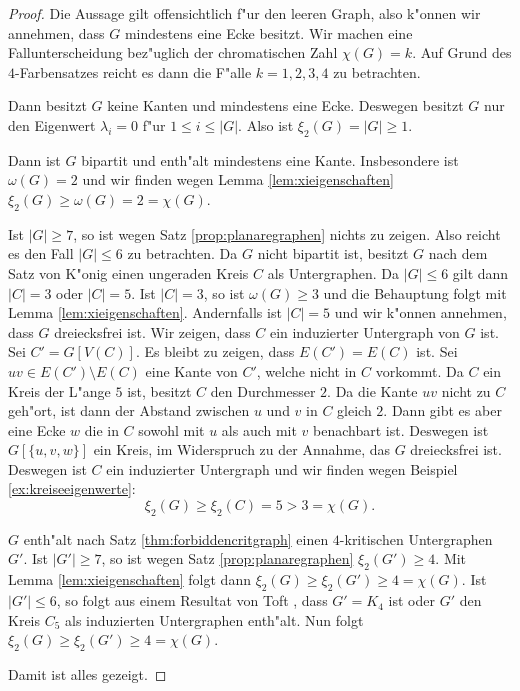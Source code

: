  \begin{proof}
    Die Aussage gilt offensichtlich f"ur den leeren Graph, also k"onnen wir annehmen, dass $G$ mindestens eine Ecke besitzt.
    Wir machen eine Fallunterscheidung bez"uglich der chromatischen Zahl $\chi(G)=k$. Auf Grund des $4$-Farbensatzes reicht es dann die F"alle $k=1,2,3,4$ zu betrachten.

     Dann besitzt $G$ keine Kanten und mindestens eine Ecke. Deswegen besitzt $G$ nur den Eigenwert $\lambda_i = 0$ f"ur $1 \leq i \leq |G|$. Also ist $\xi_{2}(G) = |G| \geq 1$.

     Dann ist $G$ bipartit und enth"alt mindestens eine Kante. Insbesondere ist $\omega(G) = 2$ und wir finden wegen Lemma \ref{lem:xieigenschaften} $\xi_{2}(G) \geq \omega(G) = 2 = \chi(G)$.

     Ist $|G| \geq 7$, so ist wegen Satz \ref{prop:planaregraphen} nichts zu zeigen. Also reicht es den Fall $|G| \leq 6$ zu betrachten. Da $G$ nicht bipartit ist, besitzt $G$ nach dem Satz von K"onig einen ungeraden Kreis $C$ als Untergraphen. Da $|G| \leq 6$ gilt dann $|C| = 3$ oder  $|C| = 5$.
    Ist $|C| = 3$, so ist $\omega(G) \geq 3$ und die Behauptung folgt mit Lemma \ref{lem:xieigenschaften}. 
    Andernfalls ist $|C| = 5$ und wir k"onnen annehmen, dass $G$ dreiecksfrei ist. Wir zeigen, dass $C$ ein induzierter Untergraph von $G$ ist. Sei $C' = G[V(C)]$. Es bleibt zu zeigen, dass $E(C') = E(C)$ ist. Sei $uv\in E(C')\setminus E(C)$ eine Kante von $C'$, welche nicht in $C$ vorkommt. 
    Da $C$ ein Kreis der L"ange $5$ ist, besitzt $C$ den Durchmesser $2$. Da die Kante $uv$ nicht zu $C$ geh"ort, ist dann der Abstand zwischen $u$ und $v$ in $C$ gleich $2$. 
    Dann gibt es aber eine Ecke $w$ die in $C$ sowohl mit $u$ als auch mit $v$ benachbart ist.
    Deswegen ist $G[\{u,v,w\}]$ ein Kreis, im Widerspruch zu der Annahme, das $G$ dreiecksfrei ist.
    Deswegen ist $C$ ein induzierter Untergraph und wir finden wegen Beispiel \ref{ex:kreiseeigenwerte}:
    $$\xi_{2}(G) \geq \xi_{2}(C) = 5 > 3 = \chi(G).$$

     $G$ enth"alt nach Satz \ref{thm:forbiddencritgraph} einen $4$-kritischen Untergraphen $G'$. Ist $|G'| \geq 7$, so ist wegen Satz \ref{prop:planaregraphen} $\xi_{2}(G') \geq 4$. Mit Lemma \ref{lem:xieigenschaften} folgt dann $\xi_{2}(G) \geq \xi_{2}(G') \geq 4 = \chi(G)$.
    Ist $|G'| \leq 6$, so folgt aus einem Resultat von Toft \cite{Toft74b}, dass $G' = K_4$ ist oder $G'$ den Kreis $C_5$ als induzierten Untergraphen enth"alt. Nun folgt $\xi_{2}(G) \geq \xi_{2}(G') \geq 4 = \chi(G)$. 

    Damit ist alles gezeigt.
  \end{proof}


